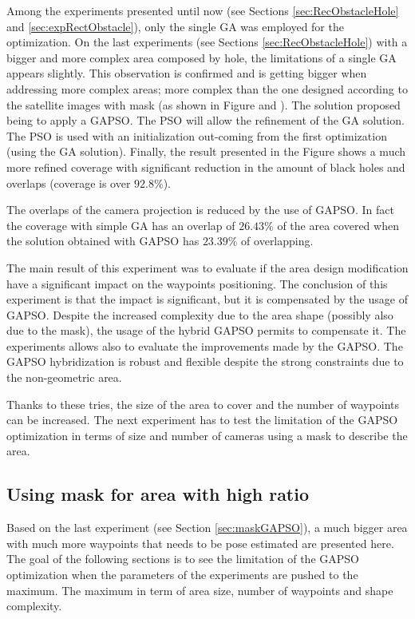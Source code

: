    Among the experiments presented until now (see Sections \ref{sec:RecObstacleHole} and \ref{sec:expRectObstacle}), only the single GA was employed for the optimization. On the last experiments (see Sections \ref{sec:RecObstacleHole}) with a bigger and more complex area composed by hole, the limitations of a single GA appears slightly. This observation is confirmed and is getting bigger when addressing more complex areas; more complex than the one designed according to the satellite images with mask (as shown in Figure  and ).
The solution proposed being to apply a GAPSO. The PSO will allow the refinement of the GA solution.
The PSO is used with an initialization out-coming from the first optimization (using the GA solution). 
Finally, the result presented in the Figure  shows a much more refined coverage with significant reduction in the amount of black holes and overlaps (coverage is over $92.8\%$). 

The overlaps of the camera projection is reduced by the use of GAPSO. In fact the coverage with simple GA has an overlap of $26.43\%$  of the area covered  when the  solution obtained with  GAPSO has $23.39\%$ of overlapping.

The main result of this experiment was to evaluate if the area design modification have a significant impact on the waypoints positioning.
 The conclusion of this experiment is that the impact is significant,  but it is compensated by the usage of GAPSO. Despite the increased complexity due to the area shape (possibly also due to the mask), the usage of the hybrid GAPSO permits to compensate it. The experiments allows also to evaluate the improvements made by the GAPSO. The GAPSO hybridization is robust and flexible despite the strong constraints due to the non-geometric area.  

Thanks to these tries, the size of the area to cover and the number of waypoints can be increased. The next experiment has to test the limitation of the GAPSO optimization in terms of size and number of cameras using a mask to describe the area.


	\subsection{Using mask for area with high ratio}
	Based on the last experiment (see Section \ref{sec:maskGAPSO}), a much bigger area with much more waypoints that needs to be pose estimated are presented here. The goal of the following sections is to see the limitation of the GAPSO optimization when the parameters of the experiments are pushed to the maximum. The maximum in term of area size, number of waypoints and shape complexity.
	
